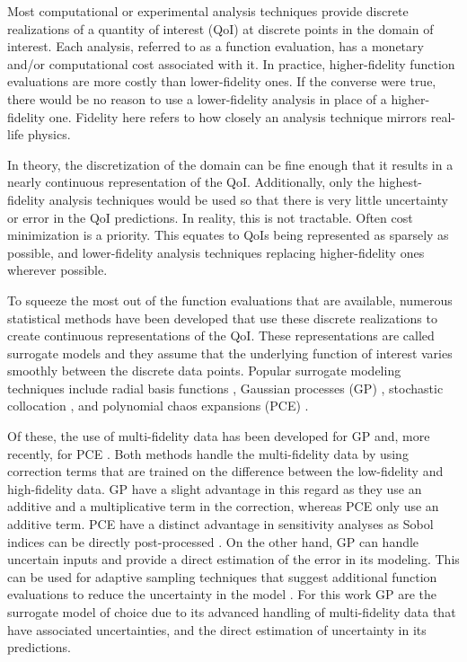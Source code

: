 Most computational or experimental analysis techniques provide discrete realizations of a quantity of interest (QoI) at discrete points in the domain of interest. 
Each analysis, referred to as a function evaluation, has a monetary and/or computational cost associated with it. 
In practice, higher-fidelity function evaluations are more costly than lower-fidelity ones.
If the converse were true, there would be no reason to use a lower-fidelity analysis in place of a higher-fidelity one.
Fidelity here refers to how closely an analysis technique mirrors real-life physics. 

In theory, the discretization of the domain can be fine enough that it results in a nearly continuous representation of the QoI.
Additionally, only the highest-fidelity analysis techniques would be used so that there is very little uncertainty or error in the QoI predictions. 
In reality, this is not tractable. 
Often cost minimization is a priority. 
This equates to QoIs being represented as sparsely as possible, and lower-fidelity analysis techniques replacing higher-fidelity ones wherever possible.  

To squeeze the most out of the function evaluations that are available, numerous statistical methods have been developed that use these discrete realizations to create continuous representations of the QoI.
These representations are called surrogate models and they assume that the underlying function of interest varies smoothly between the discrete data points.
Popular surrogate modeling techniques include radial basis functions \cite{park1991universal}, Gaussian processes (GP) \cite{krige1951statistical,matheron1963principles,rasmussen_gaussian_2006}, stochastic collocation \cite{loeven2007probabilistic}, and polynomial chaos expansions (PCE) \cite{oladyshkin2012data,blatman2011adaptive}.

Of these, the use of multi-fidelity data has been developed for GP \cite{kennedy_predicting_2000,gratiet_multi-fidelity_nodate} and, more recently, for PCE \cite{ng2012multifidelity, palar2018global}.
Both methods handle the multi-fidelity data by using correction terms that are trained on the difference between the low-fidelity and high-fidelity data. 
GP have a slight advantage in this regard as they use an additive and a multiplicative term in the correction, whereas PCE only use an additive term. 
PCE have a distinct advantage in sensitivity analyses as Sobol indices can be directly post-processed \cite{sudret2008global,crestaux2009polynomial}.
On the other hand, GP can handle uncertain inputs and provide a direct estimation of the error in its modeling.
This can be used for adaptive sampling techniques that suggest additional function evaluations to reduce the uncertainty in the model \cite{xu2011adaptive}.
For this work GP are the surrogate model of choice due to its advanced handling of multi-fidelity data that have associated uncertainties, and the direct estimation of uncertainty in its predictions. 

